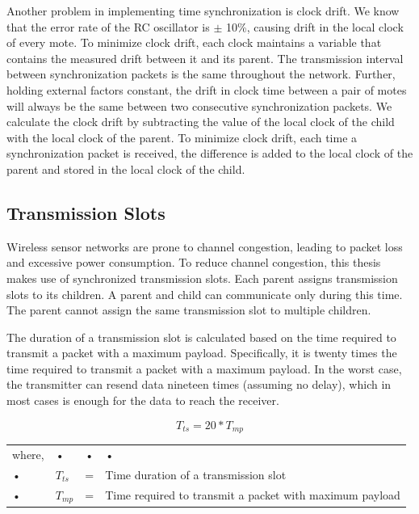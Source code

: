 Another problem in implementing time synchronization is clock drift. We know that the error rate of the RC oscillator is $\pm$ 10\%, causing drift in the local clock of every mote. To minimize clock drift, each clock maintains a variable that contains the measured drift between it and its parent. The transmission interval between synchronization packets is the same throughout the network. Further, holding external factors constant, the drift in clock time between a pair of motes will always be the same between two consecutive synchronization packets. We calculate the clock drift by subtracting the value of the local clock of the child with the local clock of the parent. To minimize clock drift, each time a synchronization packet is received, the difference is added to the local clock of the parent and stored in the local clock of the child.

\subsection{Transmission Slots}\label{sec:trans_slots}
Wireless sensor networks are prone to channel congestion, leading to packet loss and excessive power consumption. To reduce channel congestion, this thesis makes use of synchronized transmission slots. Each parent assigns transmission slots to its children. A parent and child can communicate only during this time. The parent cannot assign the same transmission slot to multiple children.

The duration of a transmission slot is calculated based on the time required to transmit a packet with a maximum payload. Specifically, it is twenty times the time required to transmit a packet with a maximum payload. In the worst case, the transmitter can resend data nineteen times (assuming no delay), which in most cases is enough for the data to reach the receiver.

\begin{equation}
T_{ts} = 20*T_{mp}
\end{equation}

\begin{tabular}{lllp{10cm}}
where, & • & • & • \\ 
• & $T_{ts}$ & = & Time duration of a transmission slot \\ 
• & $T_{mp}$ & = & Time required to transmit a packet with maximum payload \\ 
\end{tabular} 

